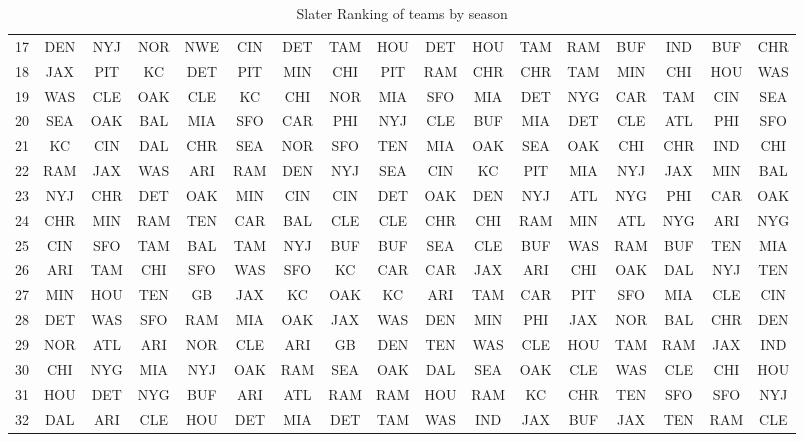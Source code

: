 \documentclass[11pt]{article}
\begin{document}
\begin{table}[!htb]
\begin{center}
\begin{tabular}{|c|c|c|c|c|c|c|c|c|c|c|c|c|c|c|c|c|}
17 & DEN & NYJ & NOR & NWE & CIN & DET & TAM & HOU & DET & HOU & TAM & RAM & BUF & IND & BUF & CHR\\
18 & JAX & PIT & KC & DET & PIT & MIN & CHI & PIT & RAM & CHR & CHR & TAM & MIN & CHI & HOU & WAS\\
19 & WAS & CLE & OAK & CLE & KC & CHI & NOR & MIA & SFO & MIA & DET & NYG & CAR & TAM & CIN & SEA\\
20 & SEA & OAK & BAL & MIA & SFO & CAR & PHI & NYJ & CLE & BUF & MIA & DET & CLE & ATL & PHI & SFO\\
21 & KC & CIN & DAL & CHR & SEA & NOR & SFO & TEN & MIA & OAK & SEA & OAK & CHI & CHR & IND & CHI\\
22 & RAM & JAX & WAS & ARI & RAM & DEN & NYJ & SEA & CIN & KC & PIT & MIA & NYJ & JAX & MIN & BAL\\
23 & NYJ & CHR & DET & OAK & MIN & CIN & CIN & DET & OAK & DEN & NYJ & ATL & NYG & PHI & CAR & OAK\\
24 & CHR & MIN & RAM & TEN & CAR & BAL & CLE & CLE & CHR & CHI & RAM & MIN & ATL & NYG & ARI & NYG\\
25 & CIN & SFO & TAM & BAL & TAM & NYJ & BUF & BUF & SEA & CLE & BUF & WAS & RAM & BUF & TEN & MIA\\
26 & ARI & TAM & CHI & SFO & WAS & SFO & KC & CAR & CAR & JAX & ARI & CHI & OAK & DAL & NYJ & TEN\\
27 & MIN & HOU & TEN & GB & JAX & KC & OAK & KC & ARI & TAM & CAR & PIT & SFO & MIA & CLE & CIN\\
28 & DET & WAS & SFO & RAM & MIA & OAK & JAX & WAS & DEN & MIN & PHI & JAX & NOR & BAL & CHR & DEN\\
29 & NOR & ATL & ARI & NOR & CLE & ARI & GB & DEN & TEN & WAS & CLE & HOU & TAM & RAM & JAX & IND\\
30 & CHI & NYG & MIA & NYJ & OAK & RAM & SEA & OAK & DAL & SEA & OAK & CLE & WAS & CLE & CHI & HOU\\
31 & HOU & DET & NYG & BUF & ARI & ATL & RAM & RAM & HOU & RAM & KC & CHR & TEN & SFO & SFO & NYJ\\
32 & DAL & ARI & CLE & HOU & DET & MIA & DET & TAM & WAS & IND & JAX & BUF & JAX & TEN & RAM & CLE\\
\hline
\end{tabular}
\caption{Slater Ranking of teams by season}\label{table:full_slater_ranking}
\end{center}
\end{table}
\end{document}
